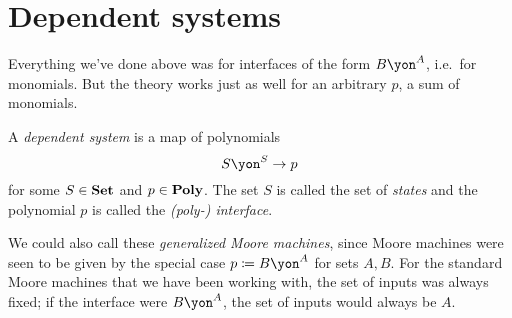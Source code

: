 \documentclass[Book-Poly]{subfiles}
\begin{document}


\section{Dependent systems}\label{sec.dependent_systems}

Everything we've done above was for interfaces of the form $B\yon^A$, i.e.\ for monomials. But the theory works just as well for an arbitrary $p$, a sum of monomials.

\begin{definition}\label{def.gen_moore}
A \emph{dependent system} is a map of polynomials
\[S\yon^S\to p\]
for some $S\in\mathbf{Set}$ and $p\in\mathbf{Poly}$. The set $S$ is called the set of \emph{states} and the polynomial $p$ is called the \emph{(poly-) interface}.
\end{definition}

We could also call these \emph{generalized Moore machines}, since Moore machines were seen to be given by the special case $p\coloneqq B\yon^A$ for sets $A,B$.
For the standard Moore machines that we have been working with, the set of inputs was always fixed; if the interface were $B\yon^A$, the set of inputs would always be $A$.
\end{document}
